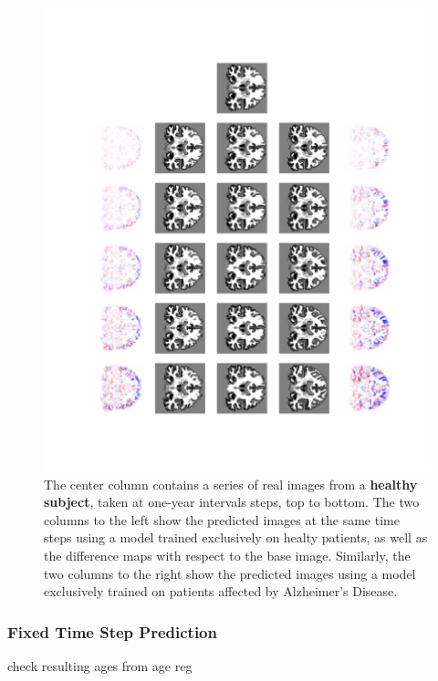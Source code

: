 \begin{figure}
	\centering
	\includegraphics[width=\linewidth, trim={100 100 66 30}, clip]{images/HC_AD_plots/comp_ADNI_137014}
	\vspace*{-15pt}
	\caption{The center column contains a series of real images from a \textbf{healthy subject}, taken at one-year intervals steps, top to bottom. The two columns to the left show the predicted images at the same time steps using a model trained exclusively on healty patients, as well as the difference maps with respect to the base image. Similarly, the two columns to the right show the predicted images using a model exclusively trained on patients affected by Alzheimer's Disease.}
	\label{fig:hcad_hc}
\end{figure}

\subsubsection*{Fixed Time Step Prediction}
check resulting ages from age reg

